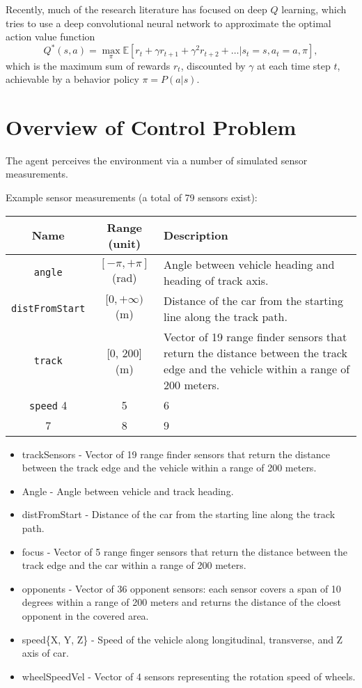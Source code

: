 \documentclass[a4paper]{article}
\begin{document}
Recently, much of the research literature has focused on deep $Q$ learning, which tries to use a deep convolutional neural network to approximate the optimal action value function
\[
  Q^* (s, a) = \max_{\pi} \mathbb{E} [r_t + \gamma r_{t+1} + \gamma^2 r_{t+2} + \dots | s_t = s, a_t = a, \pi],
\]
which is the maximum sum of rewards $r_t$, discounted by $\gamma$ at each time step $t$, achievable by a behavior policy $\pi = P(a | s)$.

\section{Overview of Control Problem}

The agent perceives the environment via a number of simulated sensor measurements.

Example sensor measurements (a total of 79 sensors exist):



\begin{tabularx}{\textwidth}{|c|c|X|}
  \hline
  {\bf Name} & {\bf Range (unit)} & {\bf Description} \\ \hline
  \texttt{angle} & $[- \pi, + \pi]$ (rad) & Angle between vehicle heading and heading of track axis. \\ \hline
  \texttt{distFromStart} & $[0, + \infty)$ (m) & Distance of the car from the starting line along the track path. \\ \hline
  \texttt{track} & [0, 200] (m) & Vector of 19 range finder sensors that return the distance between the track edge and the vehicle within a range of 200 meters. \\ \hline
  \texttt{speed}
  4 & 5 & 6 \\ \hline
  7 & 8 & 9 \\
  \hline
\end{tabularx}

\begin{itemize}
\item trackSensors - Vector of 19 range finder sensors that return the distance between the track edge and the vehicle within a range of 200 meters.
\item Angle - Angle between vehicle and track heading.
\item distFromStart - Distance of the car from the starting line along the track path. 
\item focus - Vector of 5 range finger sensors that return the distance between the track edge and the car within a range of 200 meters.
\item opponents - Vector of 36 opponent sensors: each sensor covers a span of 10 degrees within a range of 200 meters and returns the distance of the cloest opponent in the covered area.
\item speed\{X, Y, Z\} - Speed of the vehicle along longitudinal, transverse, and Z axis of car.
\item wheelSpeedVel - Vector of 4 sensors representing the rotation speed of wheels.
\end{itemize}
\end{document}
